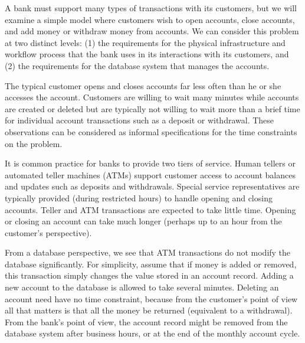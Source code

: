 \begin{example}
A bank must support many types of transactions with its customers, but 
we will examine a simple model where customers wish to open accounts,
close accounts, and add money or withdraw money from accounts.
We can consider this problem at two distinct levels:
(1) the requirements for the physical infrastructure and workflow
process that the bank uses in its interactions with its customers,
and (2) the requirements for the database system that manages the
accounts.

The typical customer opens and closes accounts far less often than he
or she accesses the account.
Customers are willing to wait many minutes while accounts are
created or deleted but are typically not willing to wait more than a
brief time for individual account transactions such as a
deposit or withdrawal.
These observations can be considered as informal specifications for
the time constraints on the problem.

It is common practice for banks to provide two tiers of service.
Human tellers or automated teller machines (ATMs) support customer
access to account balances and updates such as deposits and
withdrawals.
Special service representatives are typically provided (during
restricted hours) to handle opening and closing accounts.
Teller and ATM transactions are expected to take little time.
Opening or closing an account can take much longer (perhaps up to an
hour from the customer's perspective).

From a database perspective, we see that
ATM transactions do not modify the database significantly.
For simplicity, assume that if money is added or removed, this
transaction simply changes the value stored in an account record.
Adding a new account to the database is allowed to take several
minutes.
Deleting an account need have no time constraint, because from the
customer's point of view all that matters is that all the money be
returned (equivalent to a withdrawal).
From the bank's point of view, the account record might be removed
from the database system after business hours, or at the end of the
monthly account cycle.


\end{example}
